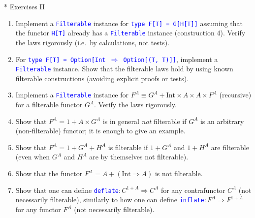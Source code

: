 \documentclass[english]{beamer}
\begin{document}
\begin{frame}{{*} Exercises II}
\begin{enumerate}
\item Implement a \texttt{\textcolor{blue}{\footnotesize{}Filterable}} instance
for \texttt{\textcolor{blue}{\footnotesize{}type F{[}T{]} = G{[}H{[}T{]}{]}}}
assuming that the functor \texttt{\textcolor{blue}{\footnotesize{}H{[}T{]}}}
already has a \texttt{\textcolor{blue}{\footnotesize{}Filterable}}
instance (construction 4). Verify the laws rigorously (i.e.\ by calculations,
not tests).
\item For \texttt{\textcolor{blue}{\footnotesize{}type F{[}T{]} = Option{[}Int
$\Rightarrow$ Option{[}(T, T){]}{]}}}, implement a \texttt{\textcolor{blue}{\footnotesize{}Filterable}}
instance. Show that the filterable laws hold by using known filterable
constructions (avoiding explicit proofs or tests).
\item Implement a \texttt{\textcolor{blue}{\footnotesize{}Filterable}} instance
for $F^{A}\equiv G^{A}+\text{Int}\times A\times A\times F^{A}$ (recursive)
for a filterable functor $G^{A}$. Verify the laws rigorously.
\item Show that $F^{A}=1+A\times G^{A}$ is in general \emph{not} filterable
if $G^{A}$ is an arbitrary (non-filterable) functor; it is enough
to give an example.
\item Show that $F^{A}=1+G^{A}+H^{A}$ is filterable if $1+G^{A}$ and $1+H^{A}$
are filterable (even when $G^{A}$ and $H^{A}$ are by themselves
not filterable).
\item Show that the functor $F^{A}=A+\left(\text{Int}\Rightarrow A\right)$
is not filterable.
\item Show that one can define \texttt{\textcolor{blue}{\footnotesize{}deflate}}$:C^{1+A}\Rightarrow C^{A}$
for any contrafunctor $C^{A}$ (not necessarily filterable), similarly
to how one can define \texttt{\textcolor{blue}{\footnotesize{}inflate}}$:F^{A}\Rightarrow F^{1+A}$
for any functor $F^{A}$ (not necessarily filterable). 
\end{enumerate}
\end{frame}
\end{document}
